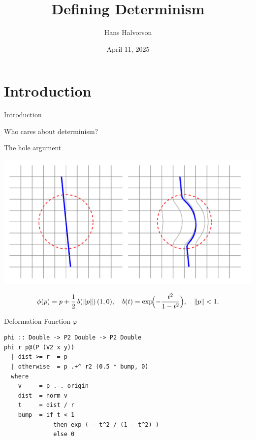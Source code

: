 \documentclass[fleqn]{beamer}
\title{Defining Determinism}
\subtitle{}
\author{Hans Halvorson}
\institute{Princeton University}
\date{April 11, 2025}
\begin{document}
\begin{frame}
   \titlepage
\end{frame}

\section{Introduction}

\begin{frame}{Introduction}


  {\Huge
    Who cares about determinism? }


\end{frame}

\begin{frame}{The hole argument}

  \includegraphics[scale=0.5]{hole.pdf}

\[
\phi(p)=p+\frac12\,b(\|p\|)\,(1,0),
\quad
b(t)=\exp\!\Bigl(-\frac{t^2}{1-t^2}\Bigr),
\quad
\|p\|<1.
\]
  

  


\end{frame}

\begin{frame}[fragile]{Deformation Function $\varphi$}
\begin{verbatim}
phi :: Double -> P2 Double -> P2 Double
phi r p@(P (V2 x y))
  | dist >= r  = p
  | otherwise  = p .+^ r2 (0.5 * bump, 0)
  where
    v     = p .-. origin
    dist  = norm v
    t     = dist / r
    bump  = if t < 1
              then exp ( - t^2 / (1 - t^2) )
              else 0
\end{verbatim}
\end{frame}
\end{document}
